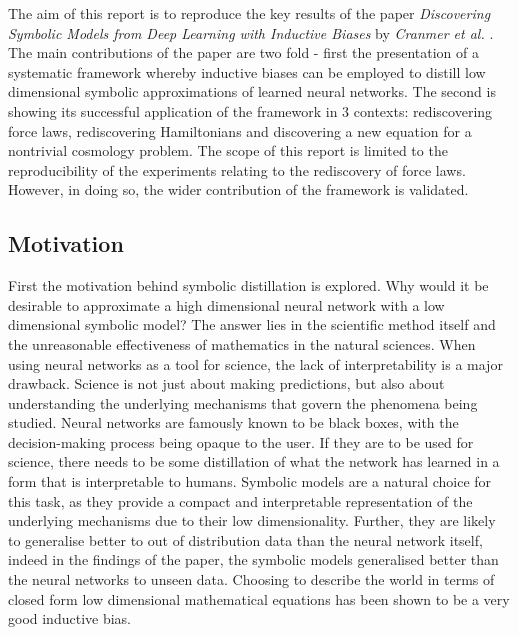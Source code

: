 \documentclass[11pt]{article}
\begin{document}





The aim of this report is to reproduce the key results of the paper \textit{Discovering Symbolic Models from Deep Learning with Inductive Biases} by \textit{Cranmer et al.} \cite{cranmer2020discoveringsymbolicmodelsdeep}. The main contributions of the paper are two fold - first the presentation of a systematic framework whereby inductive biases can be employed to distill low dimensional symbolic approximations of learned neural networks. The second is showing its successful application of the framework in 3 contexts: rediscovering force laws, rediscovering Hamiltonians and discovering a new equation for a nontrivial cosmology problem.
The scope of this report is limited to the reproducibility of the experiments relating to the rediscovery of force laws. However, in doing so, the wider contribution of the framework is validated.
\subsection{Motivation}
First the motivation behind symbolic distillation is explored. Why would it be desirable to approximate a high dimensional neural network with a low dimensional symbolic model? The answer lies in the scientific method itself and the unreasonable effectiveness of mathematics in the natural sciences.
When using neural networks as a tool for science, the lack of interpretability is a major drawback. Science is not just about making predictions, but also about understanding the underlying mechanisms that govern the phenomena being studied. Neural networks are famously known to be black boxes, with the decision-making process being opaque to the user. If they are to be used for science, there needs to be some distillation of what the network has learned in a form that is interpretable to humans. 
Symbolic models are a natural choice for this task, as they provide a compact and interpretable representation of the underlying mechanisms due to their low dimensionality. Further, they are likely to generalise better to out of distribution data than the neural network itself, indeed in the findings of the paper, the symbolic models generalised better than the neural networks to unseen data. Choosing to describe the world in terms of closed form low dimensional mathematical equations has been shown to be a very good inductive bias. 
\end{document}
